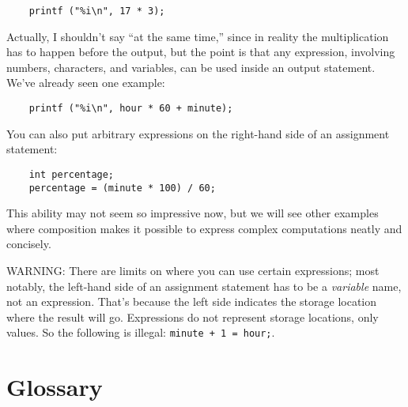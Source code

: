 \begin{verbatim}
    printf ("%i\n", 17 * 3);
\end{verbatim}
%
Actually, I shouldn't say ``at the same time,'' since in reality
the multiplication has to happen before the output, but
the point is that any expression, involving numbers, characters,
and variables, can be used inside an output statement.  We've
already seen one example:

\begin{verbatim}
    printf ("%i\n", hour * 60 + minute);
\end{verbatim}
%
You can also put arbitrary expressions on the right-hand
side of an assignment statement:

\begin{verbatim}
    int percentage;
    percentage = (minute * 100) / 60;
\end{verbatim}
%
This ability may not seem so impressive now, but we will see
other examples where composition makes it possible
to express complex computations neatly and concisely.

WARNING: There are limits on where you can use certain
expressions; most notably, the left-hand side of an assignment
statement has to be a {\em variable} name, not an expression.
That's because the left side indicates the storage location
where the result will go.  Expressions
do not represent storage locations, only values.  So the
following is illegal:  {\tt minute + 1 = hour;}.

\section{Glossary}

